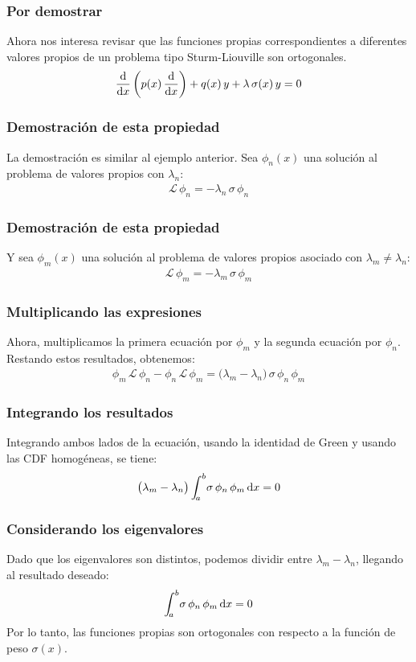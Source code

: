 \documentclass[12pt]{beamer}
\begin{document}
\begin{frame}
\frametitle{Por demostrar}
Ahora nos interesa revisar que las funciones propias correspondientes a diferentes valores propios de un problema tipo Sturm-Liouville son ortogonales.
\pause
\begin{align*}
\dv{x} \left( p(x) \, \dv{x} \right) + q(x) \, y + \lambda \, \sigma (x) \, y = 0
\end{align*}
\end{frame}
\begin{frame}
\frametitle{Demostración de esta propiedad}
La demostración es similar al ejemplo anterior. Sea $\phi_{n}(x)$ una solución al problema de valores propios con $\lambda_{n}$:
\pause
\begin{align*}
\mathcal{L} \, \phi_{n} = - \lambda_{n} \, \sigma \, \phi_{n}
\end{align*}
\end{frame}
\begin{frame}
\frametitle{Demostración de esta propiedad}
Y sea $\phi_{m}(x)$ una solución al problema de valores propios asociado con $\lambda_{m} \neq \lambda_{n}$:
\pause
\begin{align*}
\mathcal{L} \, \phi_{m} = - \lambda_{m} \, \sigma \, \phi_{m}
\end{align*}
\end{frame}
\begin{frame}
\frametitle{Multiplicando las expresiones}
Ahora, multiplicamos la primera ecuación por $\phi_{m}$ y la segunda ecuación por $\phi_{n}$. \pause Restando estos resultados, obtenemos:
\pause
\begin{align*}
\phi_{m}\, \mathcal{L} \, \phi_{n} - \phi_{n} \, \mathcal{L} \, \phi_{m} = \big( \lambda_{m} - \lambda_{n} \big) \, \sigma \, \phi_{n} \, \phi_{m}
\end{align*}
\end{frame}
\begin{frame}
\frametitle{Integrando los resultados}
Integrando ambos lados de la ecuación, usando la identidad de Green y usando las CDF homogéneas, se tiene:
\pause
\begin{align*}
\big( \lambda_{m} - \lambda_{n} \big) \, \scaleint{5ex}_{\bs a}^{b} \sigma \, \phi_{n} \, \phi_{m} \dd{x} = 0
\end{align*}
\end{frame}
\begin{frame}
\frametitle{Considerando los eigenvalores}
Dado que los eigenvalores son distintos, podemos dividir entre $\lambda_{m} - \lambda_{n}$, llegando al resultado deseado:
\pause
\begin{align*}
\scaleint{5ex}_{\bs a}^{b} \sigma \, \phi_{n} \, \phi_{m} \dd{x} = 0
\end{align*}
Por lo tanto, las funciones propias son ortogonales con respecto a la función de peso $\sigma(x)$.
\end{frame}
\end{document}
